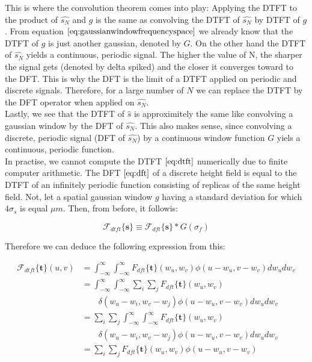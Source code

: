 This is where the convolution theorem comes into play: Applying the DTFT to the product of $\hat{s_N}$ and $g$ is the same as convolving the DTFT of $\hat{s_N}$ by DTFT of $g$. From equation $\ref{eq:gaussianwindowfrequencyspace}$ we already know that the DTFT of $g$ is just another gaussian, denoted by $G$. On the other hand the DTFT of $\hat{s_N}$ yields a continuous, periodic signal. The higher the value of N, the sharper the signal gets (denoted by delta spiked) and the closer it converges toward to the DFT. This is why the DFT is the limit of a DTFT applied on periodic and discrete signals. Therefore, for a large number of $N$ we can replace the DTFT by the DFT operator when applied on $\hat{s_N}$. \\

Lastly, we see that the DTFT of $\hat{s}$ is approximitely the same like convolving a gaussian window by the DFT of $\hat{s_N}$. This also makes sense, since convolving a discrete, periodic signal (DFT of $\hat{s_N}$) by a continuous window function $G$ yiels a continuous, periodic function. \\

In practise, we cannot compute the DTFT $\ref{eq:dtft}$ numerically due to finite computer arithmetic. The DFT $\ref{eq:dft}$ of a discrete height field is equal to the DTFT of an infinitely periodic function consisting of replicas of the same height field. Not, let a spatial gaussian window $g$ having a standard deviation for which $4\sigma_s$ is equal $\mu m$. Then, from before, it followis:

\begin{equation}
\mathcal{F}_{dtft}\{\mathbf{s}\} \equiv \mathcal{F}_{dft} \{\mathbf{s}\} * G(\sigma_f)
\end{equation} 

Therefore we can deduce the following expression from this:

\begin{align}
\mathcal{F}_{dtft} \{\mathbf{t}\}(u,v)
& = \int_{-\infty}^{\infty} \int_{-\infty}^{\infty} {F}_{dft}\{\mathbf{t}\}(w_u,w_v) \phi(u-w_u, v-w_v) dw_u dw_v \nonumber \\
& = \int_{-\infty}^{\infty} \int_{-\infty}^{\infty} \sum_i \sum_j {F}_{dft} \{\mathbf{t}\}(w_u,w_v) \nonumber \\ 
& \quad \quad \delta(w_u-w_i, w_v-w_j)\phi(u-w_u, v-w_v) dw_u dw_v \nonumber \\
& = \sum_i \sum_j \int_{-\infty}^{\infty} \int_{-\infty}^{\infty}  {F}_{dft} \{\mathbf{t}\}(w_u,w_v) \nonumber \\
& \quad \quad \delta(w_u-w_i, w_v-w_j)\phi(u-w_u, v-w_v) dw_u dw_v \nonumber \\
& = \sum_i \sum_j {F}_{dft} \{\mathbf{t}\}(w_u,w_v) \phi(u-w_u, v-w_v)
\end{align}


